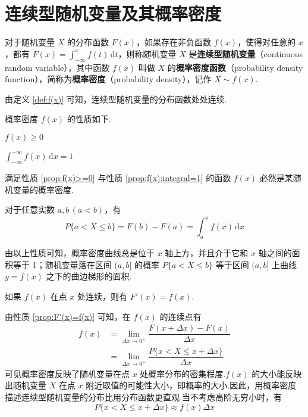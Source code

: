 \section{连续型随机变量及其概率密度}

\begin{definition} \label{def:f(x)}
    对于随机变量 $X$ 的分布函数 $F(x)$，如果存在非负函数 $f(x)$，使得对任意的 $x$，都有 $F(x)=\displaystyle\int_{-\infty}^x f(t)\,\text{d}t$，则称随机变量 $X$ 是\textbf{连续型随机变量}（continuous random variable），其中函数 $f(x)$ 叫做 $X$ 的\textbf{概率密度函数}（probability density function），简称为\textbf{概率密度}（probability density），记作 $X \sim f(x)$.
\end{definition}

由定义 \ref{def:f(x)} 可知，连续型随机变量的分布函数处处连续.

概率密度 $f(x)$ 的性质如下.

\setcounter{propertyname}{0}

\begin{property} \label{prop:f(x)>=0}
    $f(x) \geqslant 0$
\end{property}

\begin{property} \label{prop:f(x):integral=1}
    $\displaystyle\int_{-\infty}^{+\infty} f(x)\,\text{d}x = 1$
\end{property}

满足性质 \ref*{prop:f(x)>=0} 与性质 \ref*{prop:f(x):integral=1} 的函数 $f(x)$ 必然是某随机变量的概率密度.

\begin{property}
    对于任意实数 $a,b\,(a<b)$，有
    $$
    P\{a < X \leqslant b\}=F(b)-F(a)=\int_a^b f(x)\,\text{d}x
    $$
\end{property}

由以上性质可知，概率密度曲线总是位于 $x$ 轴上方，并且介于它和 $x$ 轴之间的面积等于 1；随机变量落在区间 $(a,b]$ 的概率 $P\{a < X \leqslant b\}$ 等于区间 $(a,b]$ 上曲线 $y=f(x)$ 之下的曲边梯形的面积.

\begin{property} \label{prop:F'(x)=f(x)}
    如果 $f(x)$ 在点 $x$ 处连续，则有 $F'(x)=f(x)$.
\end{property}

由性质 \ref*{prop:F'(x)=f(x)} 可知，在 $f(x)$ 的连续点有
$$
\begin{aligned}
    f(x) &= \lim_{\Delta x \to 0^+} \dfrac{F(x + \Delta x)-F(x)}{\Delta x}\\
    &= \lim_{\Delta x \to 0^+} \dfrac{P\{x < X \leqslant x + \Delta x\}}{\Delta x}
\end{aligned}
$$
可见概率密度反映了随机变量在点 $x$ 处概率分布的密集程度.$f(x)$ 的大小能反映出随机变量 $X$ 在点 $x$ 附近取值的可能性大小，即概率的大小.因此，用概率密度描述连续型随机变量的分布比用分布函数更直观.当不考虑高阶无穷小时，有
$$
P\{x < X \leqslant x + \Delta x\} \approx f(x) \Delta x
$$

